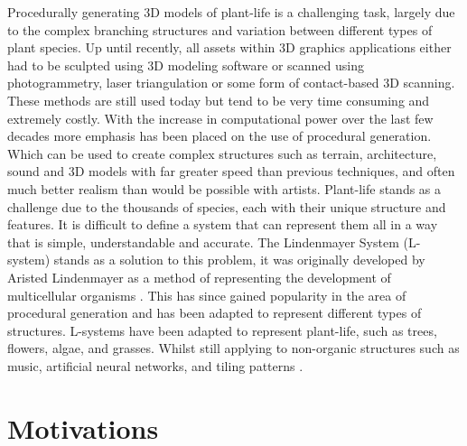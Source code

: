 \lettrine[lines=3]{P}{}rocedurally generating 3D models of plant-life is a challenging task, largely due to the complex branching structures and variation between different types of plant species. Up until recently, all assets within 3D graphics applications either had to be sculpted using 3D modeling software or scanned using photogrammetry, laser triangulation or some form of contact-based 3D scanning. These methods are still used today but tend to be very time consuming and extremely costly. With the increase in computational power over the last few decades more emphasis has been placed on the use of procedural generation. Which can be used to create complex structures such as terrain, architecture, sound and 3D models with far greater speed than previous techniques, and often much better realism than would be possible with artists. Plant-life stands as a challenge due to the thousands of species, each with their unique structure and features. It is difficult to define a system that can represent them all in a way that is simple, understandable and accurate. The Lindenmayer System (L-system) stands as a solution to this problem, it was originally developed by Aristed Lindenmayer as a method of representing the development of multicellular organisms \cite{lindenmayer1968mathematical}. This has since gained popularity in the area of procedural generation and has been adapted to represent different types of structures. L-systems have been adapted to represent plant-life, such as trees, flowers, algae, and grasses. Whilst still applying to non-organic structures such as music, artificial neural networks, and tiling patterns \cite{Prusinkiewicz1989}.

\section{Motivations}

